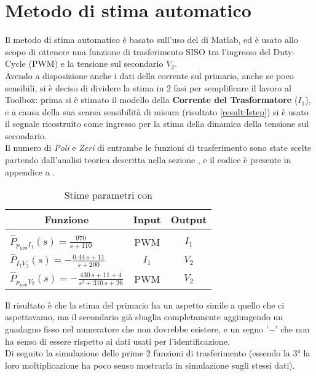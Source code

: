 \section{Metodo di stima automatico}
Il metodo di stima automatico è basato sull'uso del \cite*{IdentificationToolbox} di Matlab, ed è usato allo scopo di ottenere una funzione di trasferimento SISO tra l'ingresso del Duty-Cycle (PWM) e la tensione sul secondario $ V_2 $.\\
Avendo a disposizione anche i dati della corrente sul primario, anche se poco sensibili, si è deciso di dividere la stima in 2 fasi per semplificare il lavoro al Toolbox: prima si è stimato il modello della \textbf{Corrente del Trasformatore} ($ I_1 $), e a causa della sua scarsa sensibilità di misura (risultato \ref{result:Istep}) si è usato il segnale ricostruito come ingresso per la stima della dinamica della tensione sul secondario.\\
Il numero di \textit{Poli} e \textit{Zeri} di entrambe le funzioni di trasferimento sono state scelte partendo dall'analisi teorica descritta nella sezione , e il codice è presente in appendice a .

\begin{table}[H]
	\centering
	\caption[Stime parametri con \cite*{IdentificationToolbox}]{Stime parametri con \cite*{IdentificationToolbox}}		\label{tab:stimaAutomaticaParametri}
	\vspace{1mm}
	\begin{tabular}[t]{||l|c|c||}
		\hline
		\multicolumn{1}{||c}{\textbf{Funzione}}            & \multicolumn{1}{|c}{\textbf{Input}} & \multicolumn{1}{|c||}{\textbf{Output}} \\
		\hline\hline
		                                                   &                                     &                                        \\[-3mm]
		$\hat{P}_{p_{wm} I_1}(s) = \frac{970}{s+110}$      & PWM                                 & $I_1$                                  \\[3mm]

		$\hat{P}_{I_1 V_2}(s) = -\frac{0.44\,s+11}{s+200}$ & $I_1$                               & $V_2$                                  \\[3mm]

		$\hat{P}_{p_{wm} V_2}(s) = -\frac{430\,s+11+4}{s^2+310\,s+26}$
		                                                   & PWM                                 & $ V_2 $                                \\
		\hline
	\end{tabular}
\end{table}
\noindent
Il risultato è che la stima del primario ha un aspetto simile a quello che ci aspettavamo, ma il secondario già sbaglia completamente aggiungendo un guadagno fisso nel numeratore che non dovrebbe esistere, e un segno '$ - $' che non ha senso di essere rispetto ai dati usati per l'identificazione.\\
Di seguito la simulazione delle prime 2 funzioni di trasferimento (essendo la 3° la loro moltiplicazione ha poco senso mostrarla in simulazione sugli stessi dati).


